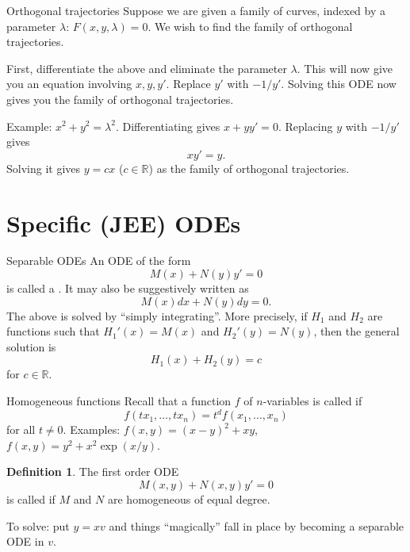 \documentclass[dvipsnames]{beamer}
\theoremstyle{definition}
\newtheorem{defn}[thm]{Definition}
\begin{document}
\begin{frame}{Orthogonal trajectories}
  Suppose we are given a family of curves, indexed by a parameter $\lambda$: $F(x, y, \lambda) = 0$. We wish to find the family of orthogonal trajectories. \pause

  First, differentiate the above and eliminate the parameter $\lambda$. \pause This will now give you an equation involving $x, y, y'$. \pause Replace $y'$ with $-1/y'$. \pause Solving this ODE now gives you the family of orthogonal trajectories. \pause

  Example: $x^{2} + y^{2} = \lambda^{2}$. \pause Differentiating gives $x + yy' = 0$. \pause Replacing $y$ with $-1/y'$ gives
  \begin{equation*} 
    xy' = y.
  \end{equation*} \pause
  Solving it gives $y = cx$ ($c \in \mathbb{R}$) as the family of orthogonal trajectories.
\end{frame}

\section{Specific (JEE) ODEs}

\begin{frame}{Separable ODEs}
  An ODE of the form
  \begin{equation*} 
    M(x) + N(y) y' = 0
  \end{equation*}
  is called a . \pause It may also be suggestively written as
  \begin{equation*} 
    M(x) dx + N(y) dy = 0.
  \end{equation*} \pause
  The above is solved by ``simply integrating''. \pause More precisely, if $H_{1}$ and $H_{2}$ are functions such that $H_{1}'(x) = M(x)$ and $H_{2}'(y) = N(y)$, \pause then the general solution is
  \begin{equation*} 
    H_{1}(x) + H_{2}(y) = c
  \end{equation*}
  for $c \in \mathbb{R}$.
\end{frame}
\begin{frame}{Homogeneous functions}
  Recall that a function $f$ of $n$-variables is called  if \pause
  \begin{equation*} 
    f(tx_{1}, \ldots, tx_{n}) = t^{d} f(x_{1}, \ldots, x_{n})
  \end{equation*}
  for all $t \neq 0$. \pause Examples: $f(x, y) = (x - y)^{2} + xy$, \pause $f(x, y) = y^{2} + x^{2} \exp(x/y)$. \pause

  \begin{defn}
    The first order ODE
    \begin{equation*} 
      M(x, y) + N(x, y) y' = 0
    \end{equation*}
    is called  if $M$ and $N$ are homogeneous of equal degree.
  \end{defn} \pause

  To solve: put $y = xv$ and things ``magically'' fall in place by becoming a separable ODE in $v$.
\end{frame}
\end{document}
